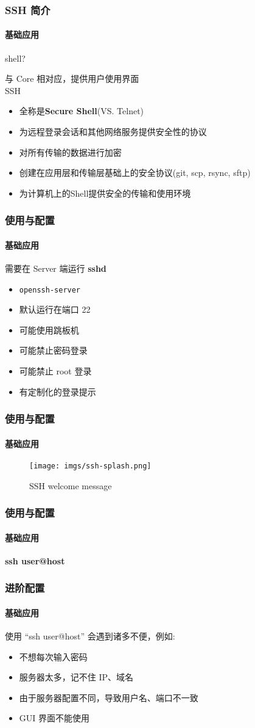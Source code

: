 \begin{frame}[fragile]
  \frametitle{SSH 简介}
  \framesubtitle{基础应用}
  shell? \pause

  与 Core 相对应，提供用户使用界面 \\ \pause
  \vspace{\baselineskip}
  SSH
  \begin{itemize}
  \item 全称是\textbf{Secure Shell}(VS. Telnet)
  \item 为远程登录会话和其他网络服务提供安全性的协议
  \item 对所有传输的数据进行加密
  \item 创建在应用层和传输层基础上的安全协议(git, scp, rsync, sftp)
  \item 为计算机上的Shell提供安全的传输和使用环境
  \end{itemize}
\end{frame}

\begin{frame}[fragile]
  \frametitle{使用与配置}
  \framesubtitle{基础应用}
  需要在 Server 端运行 \textbf{sshd}
  \begin{itemize}
  \item \verb|openssh-server|
  \item 默认运行在端口 22
  \item 可能使用跳板机
  \item 可能禁止密码登录
  \item 可能禁止 \textsf{root} 登录
  \item 有定制化的登录提示
  \end{itemize}
\end{frame}


\begin{frame}[fragile]
  \frametitle{使用与配置}
  \framesubtitle{基础应用}
  \begin{figure}[htbp]
    \centering
    \texttt{[image: imgs/ssh-splash.png]}
    \caption{SSH welcome message}
    \label{fig:ssh-splash}
  \end{figure}
\end{frame}


\begin{frame}[fragile]
  \frametitle{使用与配置}
  \framesubtitle{基础应用}

  \textbf{ssh user@host}

\end{frame}

\begin{frame}[fragile]
  \frametitle{进阶配置}
  \framesubtitle{基础应用}
  使用 ``ssh user@host'' 会遇到诸多不便，例如:
  \begin{itemize}
  \item 不想每次输入密码
  \item 服务器太多，记不住 IP、域名
  \item 由于服务器配置不同，导致用户名、端口不一致
  \item GUI 界面不能使用
  \end{itemize}
\end{frame}

